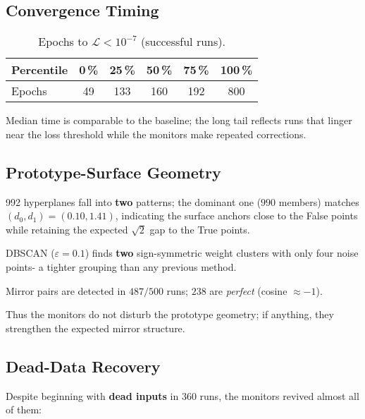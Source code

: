 \subsection*{Convergence Timing}

\begin{table}[ht]
\centering
\caption{Epochs to $\mathcal L<10^{-7}$ (successful runs).}
\label{tab:relu1-monitor-epochs}
\begin{tabular}{lccccc}
\toprule
Percentile & 0\,\% & 25\,\% & 50\,\% & 75\,\% & 100\,\% \\ \midrule
Epochs & 49 & 133 & 160 & 192 & 800 \\
\bottomrule
\end{tabular}
\end{table}

Median time is comparable to the baseline; the long tail reflects runs
that linger near the loss threshold while the monitors make repeated
corrections.

\subsection*{Prototype-Surface Geometry}

\begin{description}[leftmargin=2em]
  \item[Distance clusters]
        992 hyperplanes fall into \textbf{two} patterns; the dominant
        one ($990$ members) matches $(d_{0},d_{1})\!=\!(0.10,1.41)$,
        indicating the surface anchors close to the False points while
        retaining the expected $\sqrt2$ gap to the True points.
  \item[Weight clusters]
        DBSCAN ($\varepsilon=0.1$) finds \textbf{two} sign-symmetric
        weight clusters with only four noise points-
        a tighter grouping than any previous method.
  \item[Mirror symmetry]
        Mirror pairs are detected in $487/500$ runs; $238$ are
        \emph{perfect} (cosine $\approx-1$).
\end{description}

Thus the monitors do not disturb the prototype geometry; if anything,
they strengthen the expected mirror structure.

\subsection*{Dead-Data Recovery}
Despite beginning with \textbf{dead inputs} in 360 runs, the monitors
revived almost all of them:

